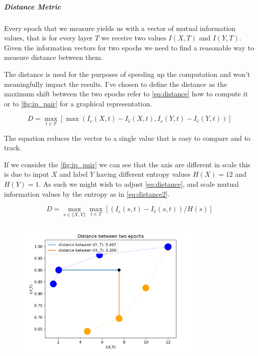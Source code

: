 \documentclass[dissertation.tex]{subfiles}
\begin{document}
  \subparagraph{Distance Metric}
  Every epoch that we measure yields us with a vector of mutual information
  values, that is for every layer $T$ we receive two values $I(X,T)$ and
  $I(Y,T)$. Given the information vectors for two epochs we need to find a
  reasonable way to measure distance between them.

  The distance is used for the purposes of speeding up the computation and won't
  meaningfully impact the results. I've chosen to define the distance as the
  maximum shift between the two epochs refer to \autoref{eq:distance} how to
  compute it or to \autoref{fig:ip_pair} for a graphical representation.

  \begin{equation}
    D = \max_{t\in T} [\max( I_e(X, t) - I_{\hat{e}}(X, t), I_e(Y, t) - I_{\hat{e}}(Y, t))]
    \label{eq:distance}
  \end{equation} 

  The equation reduces the vector to a single value that is easy to compare and
  to track.

  If we consider the \autoref{fig:ip_pair} we can see that the axis are
  different in scale this is due to input $X$ and label $Y$ having different
  entropy values $ H(X) = 12 $ and $ H(Y) = 1 $. As such we might wish to adjust
  \autoref{eq:distance}, and scale mutual information values by the entropy as
  in \autoref{eq:distance2}.

  \begin{equation}
    D = \max_{s\in\{X, Y\}} \max_{t\in T} [(I_e(s, t) - I_{\hat{e}}(s, t)) / H(s)]
    \label{eq:distance2}
  \end{equation} 

  \begin{figure}[H]
    \centering
    \includegraphics[width=0.80\textwidth]{figs/ip_pair.png}
    \label{fig:ip_pair}
  \end{figure}
\end{document}
